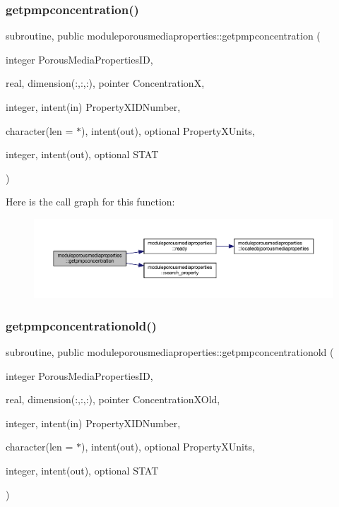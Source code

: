 \subsubsection{\texorpdfstring{getpmpconcentration()}{getpmpconcentration()}}
{\footnotesize\ttfamily subroutine, public moduleporousmediaproperties\+::getpmpconcentration (\begin{DoxyParamCaption}\item[{integer}]{Porous\+Media\+Properties\+ID,  }\item[{real, dimension(\+:,\+:,\+:), pointer}]{ConcentrationX,  }\item[{integer, intent(in)}]{Property\+X\+I\+D\+Number,  }\item[{character(len = $\ast$), intent(out), optional}]{Property\+X\+Units,  }\item[{integer, intent(out), optional}]{S\+T\+AT }\end{DoxyParamCaption})}

Here is the call graph for this function\+:\nopagebreak
\begin{figure}[H]
\begin{center}
\leavevmode
\includegraphics[width=350pt]{namespacemoduleporousmediaproperties_a7f77a3cf092866b51da8931bff80a9e3_cgraph}
\end{center}
\end{figure}
\mbox{\label{namespacemoduleporousmediaproperties_aad77475234f116fbce60ab8837dfd9e9}} 
\subsubsection{\texorpdfstring{getpmpconcentrationold()}{getpmpconcentrationold()}}
{\footnotesize\ttfamily subroutine, public moduleporousmediaproperties\+::getpmpconcentrationold (\begin{DoxyParamCaption}\item[{integer}]{Porous\+Media\+Properties\+ID,  }\item[{real, dimension(\+:,\+:,\+:), pointer}]{Concentration\+X\+Old,  }\item[{integer, intent(in)}]{Property\+X\+I\+D\+Number,  }\item[{character(len = $\ast$), intent(out), optional}]{Property\+X\+Units,  }\item[{integer, intent(out), optional}]{S\+T\+AT }\end{DoxyParamCaption})}

